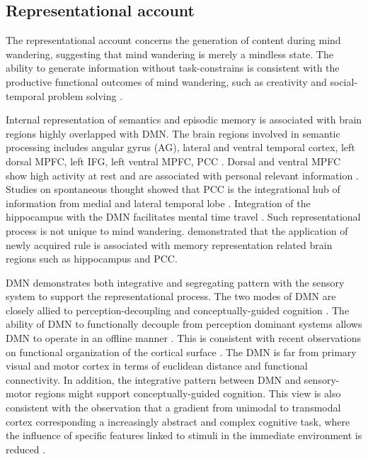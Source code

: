 \subsection{Representational account}

The representational account concerns the generation of content during mind wandering, suggesting that mind wandering is merely a mindless state. The ability to generate information without task-constrains is consistent with the productive functional outcomes of mind wandering, such as creativity \cite{Baird2012,Smeekens2016} and social-temporal problem solving \cite{RubyPlos2013,PoerioFrontiers2016,Medea2016}. 

Internal representation of semantics and episodic memory is associated with brain regions highly overlapped with DMN. The brain regions involved in semantic processing includes angular gyrus (AG), lateral and ventral temporal cortex, left dorsal MPFC, left IFG, left ventral MPFC, PCC \cite<see meta-analysis from>{Binder2009}. Dorsal and ventral MPFC show high activity at rest and are associated with personal relevant information \cite{Gusnard2001}. Studies on spontaneous thought showed that PCC is the integrational hub of information from medial and lateral temporal lobe \cite{Smallwood2016}. Integration of the hippocampus with the DMN facilitates mental time travel \cite{Karapanagiotidis2017}. Such representational process is not unique to mind wandering.  demonstrated that the application of newly acquired rule is associated with memory representation related brain regions such as hippocampus and PCC. 

DMN demonstrates both integrative and segregating pattern with the sensory system to support the representational process. The two modes of DMN are closely allied to perception-decoupling and conceptually-guided cognition \cite{Murphy2018}. The ability of DMN to functionally decouple from perception dominant systems allows DMN to operate in an offline manner \cite{Smallwood2013}. This is consistent with recent observations on functional organization of the cortical surface \cite{Margulies2016}. The DMN is far from primary visual and motor cortex in terms of euclidean distance and functional connectivity. In addition, the integrative pattern between DMN and sensory-motor regions might support conceptually-guided cognition. This view is also consistent with the observation that a gradient from unimodal to transmodal cortex \cite{Margulies2016} corresponding a increasingly abstract and complex cognitive task, where the influence of specific features linked to stimuli in the immediate environment is reduced \cite{Mesulam1998,Buckner2013,Margulies2016}.

